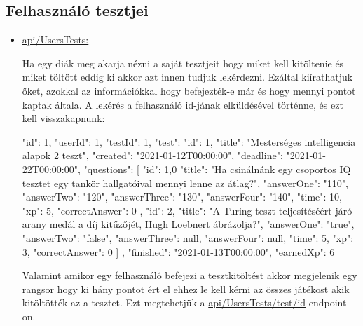 \subsection{Felhasználó tesztjei}
\begin{itemize}[label={$\bullet$}, topsep=0pt, itemsep=0pt, leftmargin=0pt]
    \item[] {\url{api/UsersTests:}}
          \begin{addmargin}[\parindent]{0pt}
              Ha egy diák meg akarja nézni a saját tesztjeit hogy miket kell kitöltenie és miket töltött eddig ki akkor azt innen tudjuk lekérdezni. Ezáltal kiírathatjuk őket, azokkal az információkkal hogy befejezték-e már és hogy mennyi pontot kaptak általa. A lekérés a felhasználó id-jának elküldésével történne, és ezt kell visszakapnunk:

              \begin{json}
{
    "id": 1,
    "userId": 1,
    "testId": 1,
    "test": {
        "id": 1,
        "title": "Mesterséges intelligencia alapok 2 teszt",
        "created": "2021-01-12T00:00:00",
        "deadline": "2021-01-22T00:00:00",
        "questions": [
            {
                "id": 1,0
                "title": "Ha csinálnánk egy csoportos IQ tesztet egy tankör hallgatóival mennyi lenne az átlag?",
                "answerOne": "110",
                "answerTwo": "120",
                "answerThree": "130",
                "answerFour": "140",
                "time": 10,
                "xp": 5,
                "correctAnswer": 0
            },
            {
                "id": 2,
                "title": "A Turing-teszt teljesítéséért járó arany medál a díj kitűzőjét, Hugh Loebnert ábrázolja?",
                "answerOne": "true",
                "answerTwo": "false",
                "answerThree": null,
                "answerFour": null,
                "time": 5,
                "xp": 3,
                "correctAnswer": 0
            }
        ]
    },
    "finished": "2021-01-13T00:00:00",
    "earnedXp": 6
}
                \end{json}

              Valamint amikor egy felhasználó befejezi a tesztkitöltést akkor megjelenik egy rangsor hogy ki hány pontot ért el ehhez le kell kérni az összes játékost akik kitöltötték az a tesztet. Ezt megtehetjük a \url{api/UsersTests/test/id} endpoint-on.
          \end{addmargin}
\end{itemize}

